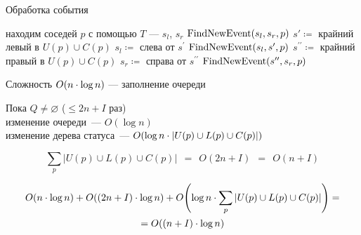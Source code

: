 \begin{frame}{Обработка события}
 \begin{algorithmic}
        \State находим соседей $p$ с помощью $T$ --- $s_l$, $s_r$
        \State $\text{FindNewEvent}\lr*{s_l,s_r,p}$
    \Else 
        \State $s' \coloneqq$ крайний левый в $U(p) \cup C(p)$
        \State $s_l \coloneqq$ слева от $s^{\prime}$
        \State $\text{FindNewEvent}\lr*{s_l,s^{\prime},p}$
        \State $s^{\prime\prime} \coloneqq$ крайний правый в $U(p) \cup C(p)$
        \State $s_r \coloneqq$ справа от $s^{\prime\prime}$
        \State $\text{FindNewEvent}\lr*{s^{\prime\prime},s_r,p}$
    \EndIf
\end{algorithmic} 
\end{frame}

\begin{frame}{Сложность}
    $O\lr*{n \cdot \log n}$ --- заполнение очереди

    Пока $Q \neq \varnothing$ ($\leq 2n+I$ раз) \\
    \qquad изменение очереди~— $O(\log n)$ \\
    \qquad изменение дерева статуса~—
        $O\lr*{\log n \cdot \left|U(p) \cup L(p) \cup C(p)\right|}$
        \vspace{-6mm}

   \[ \sum\limits_{p}|U(p) \cup L(p) \cup C(p)|\ \ =\ \ O(2n+I)\ \ =\ \ O(n+I) \]
   \vspace{-16mm}

  \begin{multline*}
     O\lr*{n \cdot \log n} + O\lr*{\lr*{2n+I} \cdot \log n} +
       O\lr*{\log n \cdot \sum\limits_{p}|U(p) \cup L(p) \cup C(p)|} = \\
       = O\lr*{\lr*{n+I}\cdot \log n}
  \end{multline*}
\end{frame}
